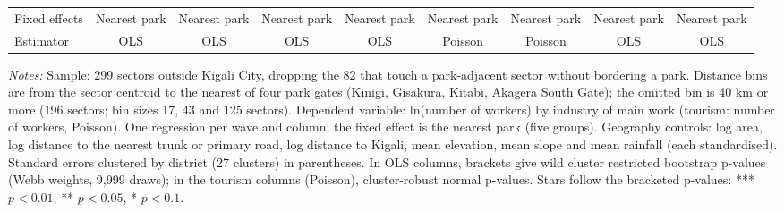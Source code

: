\documentclass[11pt]{article}
\begin{document}
\begin{table}[H]
{\begin{tabular}{lcccccccc}
Fixed effects & Nearest park & Nearest park & Nearest park & Nearest park & Nearest park & Nearest park & Nearest park & Nearest park \\
Estimator & OLS & OLS & OLS & OLS & Poisson & Poisson & OLS & OLS \\
\bottomrule
\end{tabular}}
\begin{minipage}{0.97\textwidth}\scriptsize
\textit{Notes:} Sample: 299 sectors outside Kigali City, dropping the 82 that touch a park-adjacent sector without bordering a park. Distance bins are from the sector centroid to the nearest of four park gates (Kinigi, Gisakura, Kitabi, Akagera South Gate); the omitted bin is 40 km or more (196 sectors; bin sizes 17, 43 and 125 sectors). Dependent variable: ln(number of workers) by industry of main work (tourism: number of workers, Poisson). One regression per wave and column; the fixed effect is the nearest park (five groups). Geography controls: log area, log distance to the nearest trunk or primary road, log distance to Kigali, mean elevation, mean slope and mean rainfall (each standardised). Standard errors clustered by district (27 clusters) in parentheses. In OLS columns, brackets give wild cluster restricted bootstrap p-values (Webb weights, 9,999 draws); in the tourism columns (Poisson), cluster-robust normal p-values. Stars follow the bracketed p-values: *** $p<0.01$, ** $p<0.05$, * $p<0.1$.
\end{minipage}
\end{table}
\end{document}
